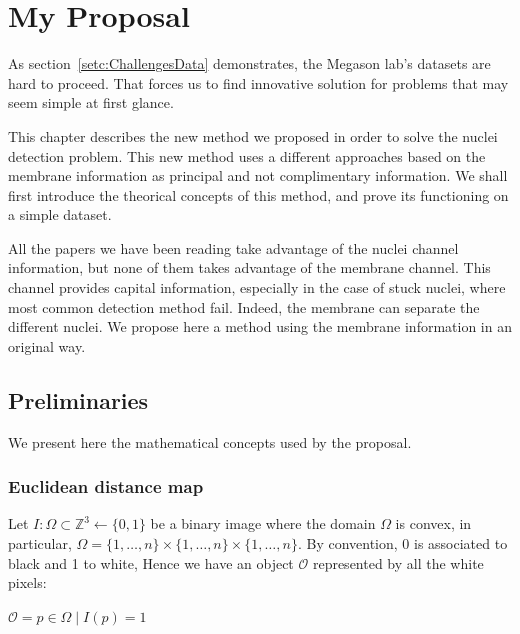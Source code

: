 
\chapter{My Proposal}
\label{chapt:proposal}


As section~\ref{setc:ChallengesData} demonstrates, the Megason lab's datasets are hard to proceed. That forces us to find innovative solution for problems that may seem simple at first glance.

This chapter describes the new method we proposed in order to solve the nuclei detection problem. This new method uses a different approaches based on the membrane information as principal and not complimentary information. We shall first introduce the theorical concepts of this method, and prove its functioning on a simple dataset.


All the papers we have been reading take advantage of the nuclei channel information, but none of them takes advantage of the membrane channel.
This channel provides capital information, especially in the case of stuck nuclei, where most common detection method fail.
Indeed, the membrane can separate the different nuclei.
We propose here a method using the membrane information in an original way.





\section{Preliminaries}
\label{sect:definitions}
We present here the mathematical concepts used by the proposal.


\subsection{Euclidean distance map}

Let \( I : \Omega \subset \mathbb{Z}^3 \leftarrow \{0,1\} \) be a binary image where the domain \({\Omega}\) is convex, in particular, \( \Omega  = \{1,{\dots},n\}{\times}\{1,{\dots},n\}{\times}\{1,{\dots},n\} \). By convention, 0 is associated to black and 1 to white, Hence we have an object \({\mathcal{O}}\) represented by all the white pixels:\\
\begin{center}
\( {\mathcal{O}} = p \in \Omega \mid I(p)=1 \)
\end{center}

